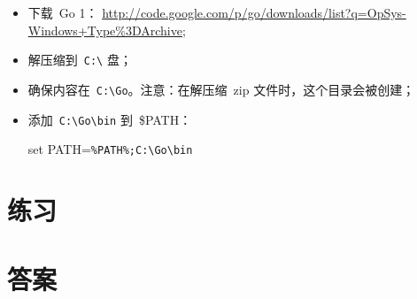 \begin{itemize}
\item 下载~Go 1：
\url{http://code.google.com/p/go/downloads/list?q=OpSys-Windows+Type%3DArchive};
\item 解压缩到~\verb|C:\| 盘；
\item 确保内容在~\verb|C:\Go|。注意：在解压缩~zip 文件时，这个目录会被创建；
\item 添加~\verb|C:\Go\bin| 到~\$PATH：
\begin{display}
set PATH=\verb|%PATH%;C:\Go\bin|
\end{display}
\end{itemize}

\section{练习}


\cleardoublepage
\section{答案}
\shipoutAnswer
